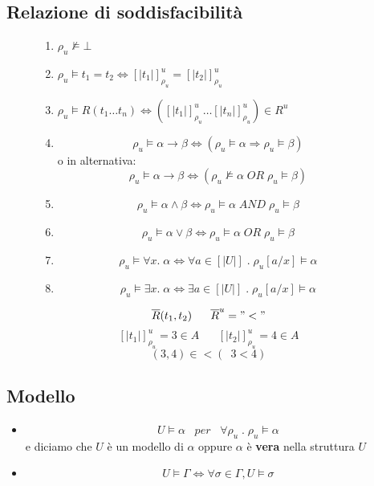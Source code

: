 \documentclass{article}
\theoremstyle{break}
\theoremstyle{break}
\theoremstyle{break}
\theoremstyle{break}
\begin{document}
\subsection{Relazione di soddisfacibilità}
\begin{figure}[H]
  \begin{definition}
    \begin{enumerate}
      \item \( \rho_u \not\models \bot \) 
      \item \( \rho_u \models t_1 = t_2 \Leftrightarrow [|t_1|]^u_{\rho_u}= [|t_2|]^u_{\rho_u} \) 
      \item \( \rho_u \models R(t_1 \ldots t_n) \Leftrightarrow ([|t_1|]^u_{\rho_u} \ldots [|t_n|]^u_{\rho_u}) \in R^u \) 
      \item \[
          \rho_u \models \alpha \to \beta \Leftrightarrow (\rho_u \models \alpha \Rightarrow \rho_u \models \beta)
        \] 
        o in alternativa:
        \[
          \rho_u \models \alpha \to \beta \Leftrightarrow (\rho_u \not\models \alpha \;OR\; \rho_u \models \beta)
        \] 
      \item \[
      \rho_u \models \alpha \wedge \beta \Leftrightarrow \rho_u \models \alpha \;AND\; \rho_u \models \beta
        \]
      \item \[
      \rho_u \models \alpha \vee \beta \Leftrightarrow \rho_u \models \alpha \;OR\; \rho_u \models \beta
      \] 
    \item \[
        \rho_u \models \forall x.\; \alpha \Leftrightarrow \forall a \in [|U|] \;.\; \rho_u[a/x] \models \alpha
      \]
    \item \[
        \rho_u \models \exists x.\; \alpha \Leftrightarrow \exists a \in [|U|] \;.\; \rho_u[a/x] \models \alpha
      \]
     
    \end{enumerate}
  \end{definition}
\end{figure}
\begin{figure}[H]
  \begin{example}
   \[
     \overline{R}(t_1,t_2) \;\;\;\;\;\; \overline{R}^u = "<" 
   \]  
   \[
     [|t_1|]^u_{\rho_u} = 3 \in A \;\;\;\;\;\; [|t_2|]^u_{\rho_u} = 4 \in  A
   \] 
   \[
     (3,4) \in < (~\; 3<4)
   \] 
  \end{example}
\end{figure}

\subsection{Modello}
\begin{itemize}
  \item 
    \[
      U \models \alpha \;\;\; per \;\;\; \forall \rho_u \;.\; \rho_u \models \alpha
    \] 
    e diciamo che \( U \) è un modello di \( \alpha \) oppure \( \alpha \) è \textbf{vera} nella struttura \( U \) 
  \item \[
      U \models \Gamma \Leftrightarrow \forall \sigma \in \Gamma, U \models \sigma
  \] 
\end{itemize}
\end{document}
